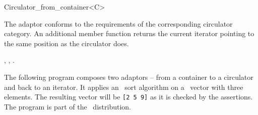 \begin{ccRefClass}{Circulator_from_container<C>}

\ccOperations

The adaptor conforms to the requirements of the corresponding
circulator category. An additional member function
 returns the current iterator pointing to
the same position as the circulator does.

\ccSeeAlso

,
,
.

\ccExample

The following program composes two adaptors -- from a container to a
circulator and back to an iterator. It applies an \stl\ sort algorithm
on a \stl\ vector with three elements. The resulting vector will be
{\tt [2 5 9]} as it is checked by the assertions. The program is
part of the \cgal\ distribution.


\end{ccRefClass}

